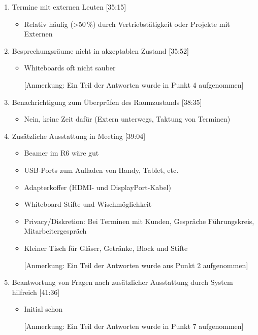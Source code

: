 \begin{enumerate}
        
    \item Termine mit externen Leuten [35:15]
    \begin{itemize}
        \item Relativ häufig (>50\,\%) durch Vertriebstätigkeit oder Projekte mit Externen 
    \end{itemize}
    
    \item Besprechungsräume nicht in akzeptablen Zustand [35:52]
    \begin{itemize}
        \item Whiteboards oft nicht sauber
        \item[] [Anmerkung: Ein Teil der Antworten wurde in Punkt 4 aufgenommen]
    \end{itemize}
    
    \item Benachrichtigung zum Überprüfen des Raumzustands [38:35]
    \begin{itemize}
        \item Nein, keine Zeit dafür (Extern unterwegs, Taktung von Terminen)
    \end{itemize}
    
    \item Zusätzliche Ausstattung in Meeting [39:04]
    \begin{itemize}
        \item Beamer im R6 wäre gut
        \item USB-Ports zum Aufladen von Handy, Tablet, etc.
        \item Adapterkoffer (HDMI- und DisplayPort-Kabel)
        \item Whiteboard Stifte und Wischmöglichkeit
        \item Privacy/Diskretion: Bei Terminen mit Kunden, Gespräche Führungskreis, Mitarbeitergespräch
        \item Kleiner Tisch für Gläser, Getränke, Block und Stifte
        \item[] [Anmerkung: Ein Teil der Antworten wurde aus Punkt 2 aufgenommen]
    \end{itemize}
    
    \item Beantwortung von Fragen nach zusätzlicher Ausstattung durch System hilfreich [41:36]
    \begin{itemize}
        \item Initial schon 
        \item[] [Anmerkung: Ein Teil der Antworten wurde in Punkt 7 aufgenommen]
    \end{itemize}
        

\end{enumerate}

